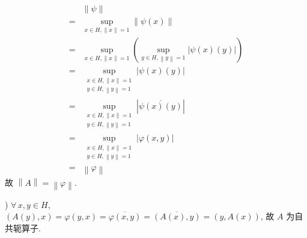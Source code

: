 \documentclass[\ROOT/main.tex]{subfiles}
\begin{document}
\begin{align*}
     & \left\| \psi \right\| \\
    =& \sup_{x \in H, \left\| x \right\| = 1} \left\| \psi \left( x \right) \right\| \\
    =& \sup_{x \in H, \left\| x \right\| = 1} \left( \sup_{y \in H, \left\| y \right\| = 1} \left| \psi \left( x \right) \left( y \right) \right| \right) \\
    =& \sup_{\substack{x \in H, \left\| x \right\| = 1 \\ y \in H, \left\| y \right\| = 1}} \left| \psi \left( x \right) \left( y \right) \right| \\
    =& \sup_{\substack{x \in H, \left\| x \right\| = 1 \\ y \in H, \left\| y \right\| = 1}} \left| \overline{\psi \left( x \right) \left( y \right)} \right| \\
    =& \sup_{\substack{x \in H, \left\| x \right\| = 1 \\ y \in H, \left\| y \right\| = 1}} \left| \varphi \left( x, y \right) \right| \\
    =& \left\| \varphi \right\|
\end{align*}
故 $\left\| A \right\| = \left\| \varphi \right\|$.

)
$\forall \, x, y \in H$, $\left( A \left( y \right), x \right) = \varphi \left( y, x \right) = \overline{\varphi \left( x, y \right)} = \overline{\left( A \left( x \right), y \right)} = \left( y, A \left( x \right) \right)$, 故 $A$ 为自共轭算子.
\end{document}
